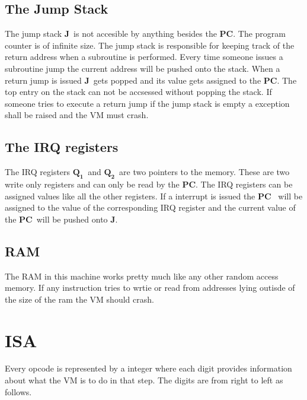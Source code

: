 \documentclass{article}
\newcommand{\q}{$\textbf{Q}_{\textbf{1}}$}
\newcommand{\qq}{$\textbf{Q}_{\textbf{2}}$}
\newcommand{\pc}{$\textbf{PC}$}
\newcommand{\J}{$\textbf{J}$}
\begin{document}
\subsection{The Jump Stack}
The jump stack \J \ is not accesible by anything besides the \pc. The program
counter is of infinite size. The jump stack is responsible for keeping track
of the return address when a subroutine is performed. Every time someone
issues a subroutine jump the current address will be pushed onto the stack.
When a return jump is issued \J \ gets popped and its value gets assigned to
the \pc. The top entry on the stack can not be accsessed without popping the
stack.
If someone tries to execute a return jump if the jump stack is empty a exception 
shall be raised and the VM must crash.

\subsection{The IRQ registers}
The IRQ registers \q \ and \qq \ are two pointers to the memory. These are two
write only registers and can only be read by the \pc. The IRQ registers can be
assigned values like all the other registers.  If a interrupt is issued the \pc
\ will be assigned to the value of the corresponding IRQ register and the current
value of the \pc \ will be pushed onto \J.

\subsection{RAM}
The RAM in this machine works pretty much like any other random access
memory. If any instruction tries to wrtie or read from addresses lying outisde
of the size of the ram the VM should crash.

\section{ISA}
Every opcode is represented by a integer where each digit provides
information about what the VM is to do in that step. The digits are from right
to left as follows.
\end{document}
